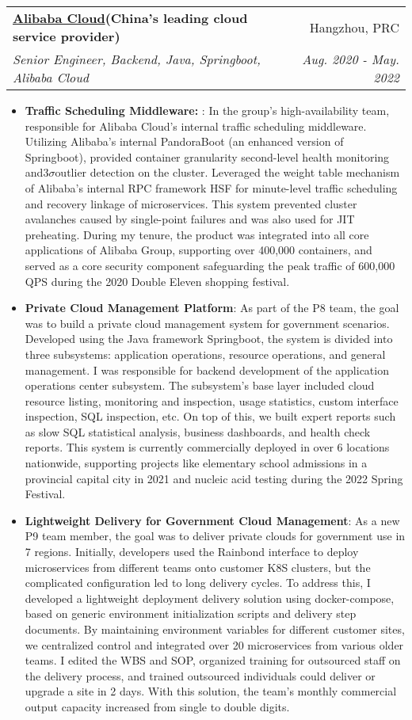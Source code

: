 \documentclass[letterpaper,11pt]{article}
\makeatletter
\newcommand{\resumeItem}[2]{
	\item\small{
		\textbf{#1}{: #2 \vspace{-2pt}}
	}
}
\newcommand{\resumeSubheading}[4]{
	\vspace{-1pt}\item
	\begin{tabular*}{0.97\textwidth}[t]{l@{\extracolsep{\fill}}r}
		\textbf{#1} & #2 \\
		\textit{\small#3} & \textit{\small #4} \\
	\end{tabular*}\vspace{-5pt}
}
\newcommand{\resumeItemListStart}{\begin{itemize}}
\newcommand{\resumeItemListEnd}{\end{itemize}\vspace{-5pt}}
\makeatother
\begin{document}
\begin{spacing}{1.0}
	
	\resumeSubheading
	{\href{https://www.alibabacloud.com/}{Alibaba Cloud}(China's leading cloud service provider)}{Hangzhou, PRC}
	{Senior Engineer, Backend, Java, Springboot, Alibaba Cloud}{Aug. 2020 - May. 2022}
	\resumeItemListStart
	\resumeItem{Traffic Scheduling Middleware: }
	{In the group's high-availability team, responsible for Alibaba Cloud's internal traffic scheduling middleware. Utilizing Alibaba's internal PandoraBoot (an enhanced version of Springboot), provided container granularity second-level health monitoring and$3\sigma$outlier detection on the cluster. Leveraged the weight table mechanism of Alibaba's internal RPC framework HSF for minute-level traffic scheduling and recovery linkage of microservices. This system prevented cluster avalanches caused by single-point failures and was also used for JIT preheating. During my tenure, the product was integrated into all core applications of Alibaba Group, supporting over 400,000 containers, and served as a core security component safeguarding the peak traffic of 600,000 QPS during the 2020 Double Eleven shopping festival.}
	\resumeItem{Private Cloud Management Platform}
	{As part of the P8 team, the goal was to build a private cloud management system for government scenarios. Developed using the Java framework Springboot, the system is divided into three subsystems: application operations, resource operations, and general management. I was responsible for backend development of the application operations center subsystem. The subsystem’s base layer included cloud resource listing, monitoring and inspection, usage statistics, custom interface inspection, SQL inspection, etc. On top of this, we built expert reports such as slow SQL statistical analysis, business dashboards, and health check reports. This system is currently commercially deployed in over 6 locations nationwide, supporting projects like elementary school admissions in a provincial capital city in 2021 and nucleic acid testing during the 2022 Spring Festival.}
	\resumeItem{Lightweight Delivery for Government Cloud Management}
	{As a new P9 team member, the goal was to deliver private clouds for government use in 7 regions. Initially, developers used the Rainbond interface to deploy microservices from different teams onto customer K8S clusters, but the complicated configuration led to long delivery cycles. To address this, I developed a lightweight deployment delivery solution using docker-compose, based on generic environment initialization scripts and delivery step documents. By maintaining environment variables for different customer sites, we centralized control and integrated over 20 microservices from various older teams. I edited the WBS and SOP, organized training for outsourced staff on the delivery process, and trained outsourced individuals could deliver or upgrade a site in 2 days. With this solution, the team’s monthly commercial output capacity increased from single to double digits.}
	\resumeItemListEnd
	

\end{spacing}
\end{document}
